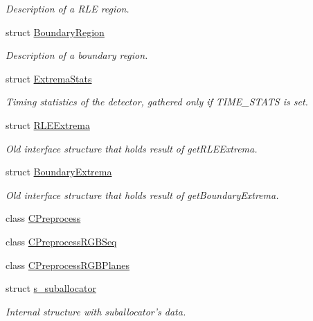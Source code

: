 \begin{CompactItemize}
\begin{CompactList}\small\item\em Description of a RLE region. \item\end{CompactList}\item 
struct \hyperlink{structextrema_1_1BoundaryRegion}{Boundary\-Region}
\begin{CompactList}\small\item\em Description of a boundary region. \item\end{CompactList}\item 
struct \hyperlink{structextrema_1_1ExtremaStats}{Extrema\-Stats}
\begin{CompactList}\small\item\em Timing statistics of the detector, gathered only if TIME\_\-STATS is set. \item\end{CompactList}\item 
struct \hyperlink{structextrema_1_1RLEExtrema}{RLEExtrema}
\begin{CompactList}\small\item\em Old interface structure that holds result of get\-RLEExtrema. \item\end{CompactList}\item 
struct \hyperlink{structextrema_1_1BoundaryExtrema}{Boundary\-Extrema}
\begin{CompactList}\small\item\em Old interface structure that holds result of get\-Boundary\-Extrema. \item\end{CompactList}\item 
class \hyperlink{classextrema_1_1CPreprocess}{CPreprocess}
\item 
class \hyperlink{classextrema_1_1CPreprocessRGBSeq}{CPreprocess\-RGBSeq}
\item 
class \hyperlink{classextrema_1_1CPreprocessRGBPlanes}{CPreprocess\-RGBPlanes}
\item 
struct \hyperlink{structextrema_1_1s__suballocator}{s\_\-suballocator}
\begin{CompactList}\small\item\em Internal structure with suballocator's data. \item\end{CompactList}\end{CompactItemize}
